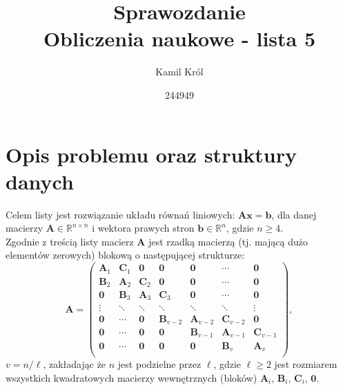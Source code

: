 \documentclass[]{article}
\title{
	Sprawozdanie \\
	\large 
	Obliczenia naukowe - lista 5}
\author{Kamil Król}
\date{244949}
\newcommand{\mA}{\bm{A}}
\newcommand{\mB}{\bm{B}}
\newcommand{\mC}{\bm{C}}
\newcommand{\mZ}{\bm{0}}
\newcommand{\vb}{\bm{b}}
\newcommand{\vx}{\bm{x}}
\newcommand{\R}{\mathbb{R}}
\begin{document}
	
	\maketitle
	
	\section*{Opis problemu oraz struktury danych}
	Celem listy jest rozwiązanie układu równań liniowych: 
	$\mA\vx = \vb$,
	dla danej macierzy $\mA \in \R^{n\times n}$ 
	i wektora prawych stron $\vb \in \R^n$, gdzie $n \geq 4$. \\
	
	\noindent Zgodnie z treścią listy macierz $\mA$ jest rzadką macierzą (tj. mającą dużo elementów zerowych) blokową o następującej strukturze:
	$$
	\mA =
	\left(\begin{array}{ccccccc}
	\mA_1 & \mC_1 & \mZ & \mZ & \mZ & \cdots & \mZ \\
	\mB_2 & \mA_2 & \mC_2 & \mZ & \mZ  & \cdots & \mZ \\
	\mZ  & \mB_3 & \mA_3 & \mC_3 & \mZ  & \cdots & \mZ \\
	\vdots & \ddots & \ddots & \ddots & \ddots & \ddots & \vdots\\
	\mZ   & \cdots & \mZ  & \mB_{v-2} & \mA_{v-2} & \mC_{v-2} & \mZ \\
	\mZ  & \cdots & \mZ  &  \mZ &\mB_{v-1} & \mA_{v-1} & \mC_{v-1}  \\
	\mZ  & \cdots & \mZ & \mZ & \mZ& \mB_{v} & \mA_{v}  \\
	\end{array}\right),
	$$
	$v = n/\ell$, zakładając że $n$ jest podzielne przez $\ell$, gdzie $\ell \geq 2$ jest rozmiarem wszystkich kwadratowych macierzy wewnętrznych (bloków) $\mA_i$, $\mB_i$, $\mC_i$, $\mZ$. \\
	
\end{document}
